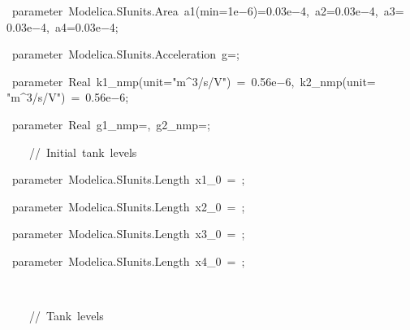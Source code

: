 {{\hlstd \ }{\hlkwa parameter\ }{\hlstd Modelica.SIunits.Area\ a1}{\hlopt (}{\hlstd min}{\hlopt $\mathord{=}$}{\hlstd }{\hlnum 1e$\mathord{-}$6}{\hlstd }{\hlopt )$\mathord{=}$}{\hlstd }{\hlnum 0.03e$\mathord{-}$4}{\hlstd }{\hlopt ,\ }{\hlstd a2}{\hlopt $\mathord{=}$}{\hlstd }{\hlnum 0.03e$\mathord{-}$4}{\hlstd }{\hlopt ,\ }{\hlstd a3}{\hlopt $\mathord{=}$}{\hlstd }{\hlnum 0.03e$\mathord{-}$4}{\hlstd }{\hlopt ,\ }{\hlstd a4}{\hlopt $\mathord{=}$}{\hlstd }{\hlnum 0.03e$\mathord{-}$4}{\hlstd }{\hlopt ;}\leavevmode\par
{\hlstd \ }{\hlkwa parameter\ }{\hlstd Modelica.SIunits.Acceleration\ g}{\hlopt $\mathord{=}$}{\hlstd }{}{\hlstd }{\hlopt ;}\leavevmode\par
{\hlstd \ }{\hlkwa parameter\ }{\hlstd Real\ k1\_{}nmp}{\hlopt (}{\hlstd unit}{\hlopt $\mathord{=}$}{\hlstd }{\hlstr "m{\bf\^{}}3/s/V"}{\hlstd }{\hlopt )\ $\mathord{=}$\ }{\hlstd }{\hlnum 0.56e$\mathord{-}$6}{\hlstd }{\hlopt ,\ }{\hlstd k2\_{}nmp}{\hlopt (}{\hlstd unit}{\hlopt $\mathord{=}$}{\hlstd }{\hlstr "m{\bf\^{}}3/s/V"}{\hlstd }{\hlopt )\ $\mathord{=}$\ }{\hlstd }{\hlnum 0.56e$\mathord{-}$6}{\hlstd }{\hlopt ;}\leavevmode\par
{\hlstd \ }{\hlkwa parameter\ }{\hlstd Real\ g1\_{}nmp}{\hlopt $\mathord{=}$}{\hlstd }{}{\hlstd }{\hlopt ,\ }{\hlstd g2\_{}nmp}{\hlopt $\mathord{=}$}{\hlstd }{}{\hlstd }{\hlopt ;}\leavevmode\par
{\hlstd \leavevmode\par
}{\hlstd\ \ \ \ }{\hlstd }{\hlslc //\ Initial\ tank\ levels}\leavevmode\par
{\hlstd \ }{\hlkwa parameter\ }{\hlstd Modelica.SIunits.Length\ x1\_{}0\ }{\hlopt $\mathord{=}$\ }{\hlstd }{}{\hlstd }{\hlopt ;}\leavevmode\par
{\hlstd \ }{\hlkwa parameter\ }{\hlstd Modelica.SIunits.Length\ x2\_{}0\ }{\hlopt $\mathord{=}$\ }{\hlstd }{}{\hlstd }{\hlopt ;}\leavevmode\par
{\hlstd \ }{\hlkwa parameter\ }{\hlstd Modelica.SIunits.Length\ x3\_{}0\ }{\hlopt $\mathord{=}$\ }{\hlstd }{}{\hlstd }{\hlopt ;}\leavevmode\par
{\hlstd \ }{\hlkwa parameter\ }{\hlstd Modelica.SIunits.Length\ x4\_{}0\ }{\hlopt $\mathord{=}$\ }{\hlstd }{}{\hlstd }{\hlopt ;}\leavevmode\par
{\hlstd \ \leavevmode\par
}{\hlstd\ \ \ \ }{\hlstd }{\hlslc //\ Tank\ levels}\leavevmode\par
}
